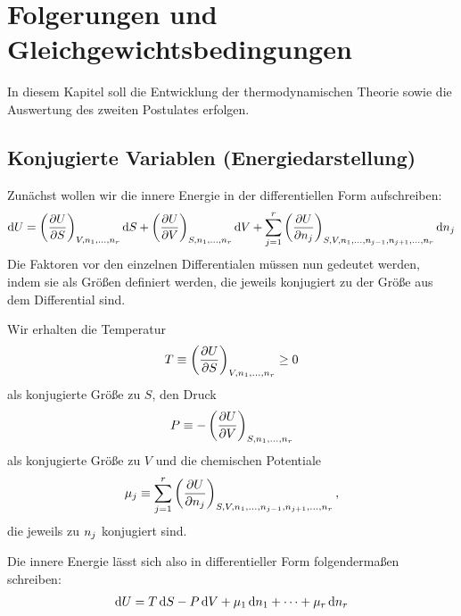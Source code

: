 
\section{Folgerungen und Gleichgewichtsbedingungen}

In diesem Kapitel soll die Entwicklung der thermodynamischen Theorie sowie die Auswertung des zweiten Postulates erfolgen.

\subsection{Konjugierte Variablen (Energiedarstellung)}

Zunächst wollen wir die innere Energie in der differentiellen Form aufschreiben:
\begin{align*}
    \mathop{}\!\mathrm{d} U = \left(\frac{\partial U}{\partial S}\right)_{V,n_1,\ldots,n_r} \mathop{}\!\mathrm{d} S + \left(\frac{\partial U}{\partial V}\right)_{S,n_1,\ldots,n_r} \mathop{}\!\mathrm{d} V + \sum_{j = 1}^r \left(\frac{\partial U}{\partial n_j}\right)_{S,V,n_1,\ldots,n_{j - 1},n_{j + 1},\ldots,n_r} \mathop{}\!\mathrm{d} n_j
\end{align*}
Die Faktoren vor den einzelnen Differentialen müssen nun gedeutet werden, indem sie als Größen definiert werden, die jeweils konjugiert zu der Größe aus dem Differential sind.

Wir erhalten die Temperatur
\begin{align}
    \label{eq:def_temperatur}
    T \equiv \left(\frac{\partial U}{\partial S}\right)_{V,n_1,\ldots,n_r} \geq 0
\end{align}
als konjugierte Größe zu $S$, den Druck
\begin{align}
    \label{eq:def_druck}
    P \equiv -\left(\frac{\partial U}{\partial V}\right)_{S,n_1,\ldots,n_r}
\end{align}
als konjugierte Größe zu $V$ und die chemischen Potentiale
\begin{align}
    \label{eq:def_chemische_potentiale}
    \mu_j \equiv \sum_{j = 1}^r \left(\frac{\partial U}{\partial n_j}\right)_{S,V,n_1,\ldots,n_{j - 1},n_{j + 1},\ldots,n_r},
\end{align}
die jeweils zu $n_j$ konjugiert sind.

Die innere Energie lässt sich also in differentieller Form folgendermaßen schreiben:
\begin{align}
    \label{eq:innere_energie_differentielle_form}
    \mathop{}\!\mathrm{d} U = T\mathop{}\!\mathrm{d} S - P \mathop{}\!\mathrm{d} V + \mu_1 \mathop{}\!\mathrm{d} n_1 + \cdots + \mu_r \mathop{}\!\mathrm{d} n_r
\end{align}

